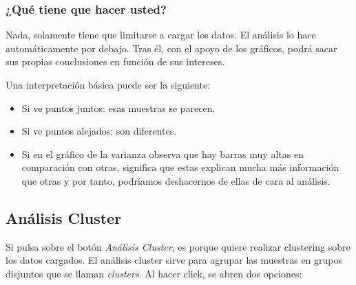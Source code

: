\subsubsection{¿Qué tiene que hacer usted?}

Nada, solamente tiene que limitarse a cargar los datos. El análisis lo hace automáticamente por debajo. Tras él, con el apoyo
de los gráficos, podrá sacar sus propias conclusiones en función de sus intereses. \newline

Una interpretación básica puede ser la siguiente: 

\begin{itemize}
    \item Si ve puntos juntos: esas muestras se parecen.
    \item Si ve puntos alejados: son diferentes.
    \item Si en el gráfico de la varianza observa que hay barras muy altas en comparación con otras, significa que estas explican
    mucha más información que otras y por tanto, podríamos deshacernos de ellas de cara al análisis.
\end{itemize}

\subsection{Análisis Cluster}

Si pulsa sobre el botón \textit{Análisis Cluster}, es porque quiere realizar clustering sobre los datos cargados. El análisis cluster sirve para 
agrupar las muestras en grupos disjuntos que se llaman \textit{clusters}. Al hacer click, se abren dos opciones:

